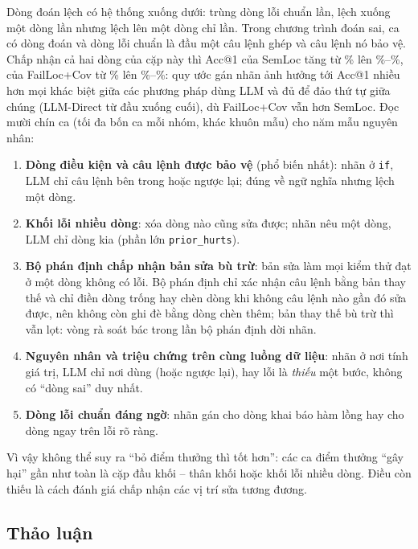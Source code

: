 \label{sec:mo-ho}%
Dòng đoán lệch có hệ thống xuống dưới: trùng dòng lỗi chuẩn \OffLlmGuessZeroCount{} lần, lệch xuống một dòng
\OffLlmGuessOneCount{} lần nhưng lệch lên một dòng chỉ \OffLlmGuessMinusOneCount{} lần. Trong \FailWrongGuessN{} chương
trình đoán sai, \FailRelationHeaderBodyN{} ca có dòng đoán và dòng lỗi chuẩn là đầu một câu lệnh ghép và câu lệnh nó bảo
vệ. Chấp nhận cả hai dòng của cặp này thì Acc@1 của SemLoc tăng từ \TolSemlocAccOneExact\% lên
\TolSemlocAccOneGuardStrict\%--\TolSemlocAccOneGuardOrBody\%, của FailLoc+Cov từ \TolLlmCoverageAccOneExact\% lên
\TolLlmCoverageAccOneGuardStrict\%--\TolLlmCoverageAccOneGuardOrBody\%: quy ước gán nhãn ảnh hưởng tới Acc@1 nhiều hơn
mọi khác biệt giữa các phương pháp dùng LLM và đủ để đảo thứ tự giữa chúng (LLM-Direct từ đầu xuống cuối), dù FailLoc+Cov
vẫn hơn SemLoc. Đọc mười chín ca (tối đa bốn ca mỗi nhóm,
khác khuôn mẫu) cho năm mẫu nguyên nhân:
\begin{enumerate}
\item \textbf{Dòng điều kiện và câu lệnh được bảo vệ} (phổ biến nhất): nhãn ở \texttt{if}, LLM chỉ câu lệnh bên trong
  hoặc ngược lại; đúng về ngữ nghĩa nhưng lệch một dòng.
\item \textbf{Khối lỗi nhiều dòng}: xóa dòng nào cũng sửa được; nhãn nêu một dòng, LLM chỉ dòng kia (phần lớn \texttt{prior\_hurts}).
\item \textbf{Bộ phán định chấp nhận bản sửa bù trừ}: bản sửa làm mọi kiểm thử đạt ở một dòng không có lỗi. Bộ phán định
  chỉ xác nhận câu lệnh bằng bản thay thế và chỉ điền dòng trống hay chèn dòng khi không câu lệnh nào gần đó sửa được, nên
  không còn ghi đè bằng dòng chèn thêm; bản thay thế bù trừ thì vẫn lọt: vòng rà soát bác \ReviewCorrectedOverturnedN{}
  trong \GtCorrectedN{} lần bộ phán định dời nhãn.
\item \textbf{Nguyên nhân và triệu chứng trên cùng luồng dữ liệu}: nhãn ở nơi tính giá trị, LLM chỉ nơi dùng (hoặc ngược
  lại), hay lỗi là \emph{thiếu} một bước, không có ``dòng sai'' duy nhất.
\item \textbf{Dòng lỗi chuẩn đáng ngờ}: nhãn gán cho dòng khai báo hàm lồng hay cho dòng ngay trên lỗi rõ ràng.\end{enumerate}
Vì vậy không thể suy ra ``bỏ điểm thưởng thì tốt hơn'': các ca điểm thưởng ``gây hại'' gần như toàn là cặp đầu khối --
thân khối hoặc khối lỗi nhiều dòng. Điều còn thiếu là cách đánh giá chấp nhận các vị trí sửa tương đương.

\subsection{Thảo luận}
\label{sec:thao-luan}

